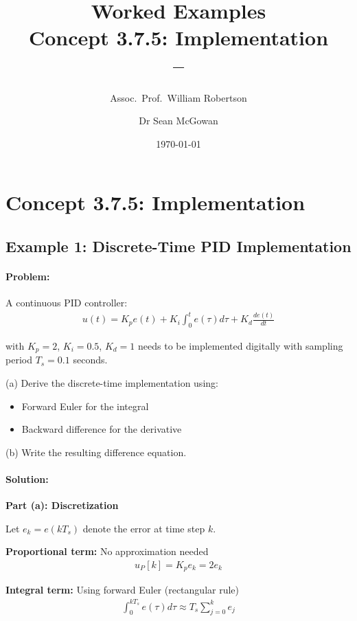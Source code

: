 \documentclass[11pt,a4paper]{article}
\title{\textbf{Worked Examples}\\[0.5em]
\large Concept 3.7.5: Implementation\\[0.3em]
\normalsize \coursesubtitle{} -- \coursetitle}
\author{Assoc.\ Prof.\ William Robertson \and Dr Sean McGowan}
\date{\today}
\begin{document}
\maketitle
\tableofcontents
\newpage

\section{Concept 3.7.5: Implementation}

\subsection{Example 1: Discrete-Time PID Implementation}

\paragraph{Problem:} A continuous PID controller:
\begin{align}
  u(t) = K_p e(t) + K_i \int_0^t e(\tau)d\tau + K_d \frac{de(t)}{dt}
\end{align}

with $K_p = 2$, $K_i = 0.5$, $K_d = 1$ needs to be implemented digitally with sampling period $T_s = 0.1$ seconds.

(a) Derive the discrete-time implementation using:
\begin{itemize}
  \item Forward Euler for the integral
  \item Backward difference for the derivative
\end{itemize}

(b) Write the resulting difference equation.

\paragraph{Solution:}

\textbf{Part (a): Discretization}

Let $e_k = e(kT_s)$ denote the error at time step $k$.

\textbf{Proportional term:} No approximation needed
\begin{align}
  u_P[k] = K_p e_k = 2e_k
\end{align}

\textbf{Integral term:} Using forward Euler (rectangular rule)
\begin{align}
  \int_0^{kT_s} e(\tau)d\tau \approx T_s \sum_{j=0}^{k} e_j
\end{align}
\end{document}
